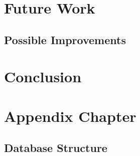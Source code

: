 \documentclass[a4paper, oneside]{csthesis}
\begin{document}
\chapter{Future Work}
	
\section{Possible Improvements}

\chapter{Conclusion}

	




\appendix
\chapter{Appendix Chapter}

\section{Database Structure}

	
\end{document}
